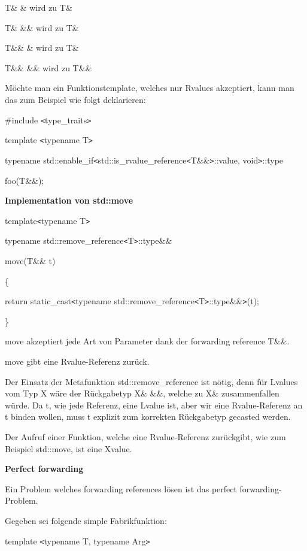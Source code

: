 \documentclass{article}
\begin{document}
T\& \& wird zu T\&

T\& \&\& wird zu T\&

T\&\& \& wird zu T\&

T\&\& \&\& wird zu T\&\&

\vspace{12pt}
Möchte man ein Funktionstemplate, welches nur Rvalues akzeptiert, kann man das 
zum Beispiel wie folgt deklarieren:

\#include \texttt{<}type\_traits\texttt{>}

template \texttt{<}typename T\texttt{>}

typename std::enable\_if\texttt{<}std::is\_rvalue\_reference\texttt{<}T\&\&\texttt{>}::value, 
void\texttt{>}::type

foo(T\&\&);

\vspace{12pt}
\textbf{Implementation von std::move}

template\texttt{<}typename T\texttt{>}

typename std::remove\_reference\texttt{<}T\texttt{>}::type\&\&

move(T\&\& t)

\{    

\parindent=14pt
return static\_cast\texttt{<}typename std::remove\_reference\texttt{<}T\texttt{>}::type\&\&\texttt{>}(t);

\parindent=0pt
\}

move akzeptiert jede Art von Parameter dank der forwarding reference T\&\&.

move gibt eine Rvalue-Referenz zurück.

Der Einsatz der Metafunktion std::remove\_reference ist nötig, denn für Lvalues 
vom Typ X wäre der Rückgabetyp X\& \&\&, welche zu X\& zusammenfallen würde. 
Da t, wie jede Referenz, eine Lvalue ist, aber wir eine Rvalue-Referenz an t binden 
wollen, muss t explizit zum korrekten Rückgabetyp gecasted werden. 

Der Aufruf einer Funktion, welche eine Rvalue-Referenz zurückgibt, wie zum Beispiel 
std::move, ist eine Xvalue.

\vspace{12pt}
\textbf{Perfect forwarding}

Ein Problem welches forwarding references lösen ist das perfect forwarding-Problem.

Gegeben sei folgende simple Fabrikfunktion:

template \texttt{<}typename T, typename Arg\texttt{>}
\end{document}
